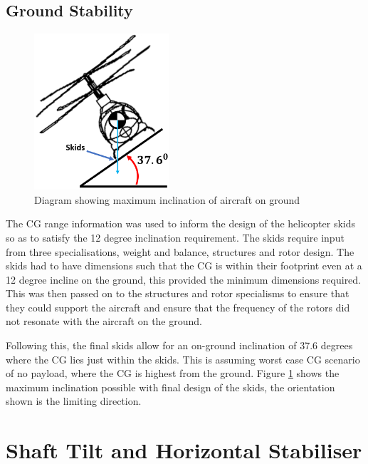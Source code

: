 \documentclass[11pt,a4paper]{article}
\begin{document}
\subsection{Ground Stability}
\begin{figure}
\begin{center}
    \includegraphics[width=5cm]{skids.PNG}
\end{center}
        \caption{Diagram showing maximum inclination of aircraft on ground}
    \label{fig:skids}
\end{figure}
The CG range information was used to inform the design of the helicopter skids so as to satisfy the 12 degree inclination requirement. 
The skids require input from three specialisations, weight and balance, structures and rotor design. The skids had to have dimensions such that the CG is within their footprint even at a 12 degree incline on the ground, this provided the minimum dimensions required. This was then passed on to the structures and rotor specialisms to ensure that they could support the aircraft and ensure that the frequency of the rotors did not resonate with the aircraft on the ground.

Following this, the final skids allow for an on-ground inclination of 37.6 degrees where the CG lies just within the skids. This is assuming worst case CG scenario of no payload, where the CG is highest from the ground. Figure \ref{fig:skids} shows the maximum inclination possible with final design of the skids, the orientation shown is the limiting direction. \\
\section{Shaft Tilt and Horizontal Stabiliser}
\end{document}
